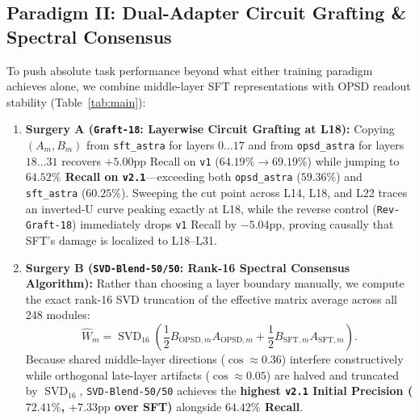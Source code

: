 \documentclass[11pt,a4paper]{article}
\begin{document}
\subsection{Paradigm II: Dual-Adapter Circuit Grafting \& Spectral Consensus}
To push absolute task performance beyond what either training paradigm achieves alone, we combine middle-layer SFT representations with OPSD readout stability (Table~\ref{tab:main}):
\begin{enumerate}
    \item \textbf{Surgery A (\texttt{Graft-18}: Layerwise Circuit Grafting at L18):} Copying $(A_m, B_m)$ from \texttt{sft\_astra} for layers $0\dots 17$ and from \texttt{opsd\_astra} for layers $18\dots 31$ recovers $+5.00\text{pp}$ Recall on \texttt{v1} ($64.19\% \to 69.19\%$) while jumping to \textbf{$64.52\%$ Recall on \texttt{v2.1}}—exceeding both \texttt{opsd\_astra} ($59.36\%$) and \texttt{sft\_astra} ($60.25\%$). Sweeping the cut point across L14, L18, and L22 traces an inverted-U curve peaking exactly at L18, while the reverse control (\texttt{Rev-Graft-18}) immediately drops \texttt{v1} Recall by $-5.04\text{pp}$, proving causally that SFT's damage is localized to L18--L31.
    \item \textbf{Surgery B (\texttt{SVD-Blend-50/50}: Rank-16 Spectral Consensus Algorithm):} Rather than choosing a layer boundary manually, we compute the exact rank-16 SVD truncation of the effective matrix average across all 248 modules:
    \begin{equation}
    \widehat{W}_m = \operatorname{SVD}_{16}\!\left(\frac{1}{2} B_{\text{OPSD},m} A_{\text{OPSD},m} + \frac{1}{2} B_{\text{SFT},m} A_{\text{SFT},m}\right).
    \end{equation}
    Because shared middle-layer directions ($\cos \approx 0.36$) interfere constructively while orthogonal late-layer artifacts ($\cos \approx 0.05$) are halved and truncated by $\operatorname{SVD}_{16}$, \texttt{SVD-Blend-50/50} achieves the \textbf{highest \texttt{v2.1} Initial Precision ($72.41\%$, $+7.33\text{pp}$ over SFT)} alongside \textbf{$64.42\%$ Recall}.
\end{enumerate}
\end{document}
